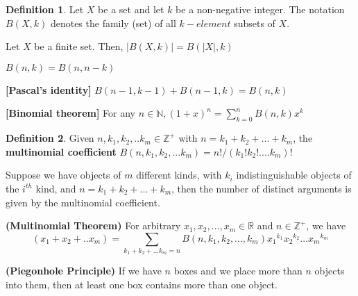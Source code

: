 \documentclass{article}
\theoremstyle{definition}
\newtheorem*{defi}{Definition}
\theoremstyle{definition}
\newenvironment{manualprop}[1]{%
  \renewcommand\themanualpropinner{#1}%
  \manualpropinner
}{\endmanualpropinner}
\theoremstyle{named}
\begin{document}
\begin{defi}
    Let $X$ be a set and let $k$ be a non-negative integer. The notation $B(X, k)$ denotes the family (set) of all $k-element$ subsets of $X$.
\end{defi}

\begin{manualprop}{26}
    Let $X$ be a finite set. Then, $|B(X, k)| = B(|X|, k)$
\end{manualprop}

\begin{manualprop}{27}
    \begin{citemize}
        \item $B(n, k) = B(n, n-k)$
        \item \textbf{[Pascal's identity]} $B(n-1, k-1) + B(n-1, k) = B(n, k)$
        \item \textbf{[Binomial theorem]} For any $n \in \mathbb{N}, (1+x)^n = \sum_{k=0}^{n} B(n, k)x^k$
    \end{citemize}
\end{manualprop}

\begin{defi}
    Given $n, k_1, k_2, .. k_m \in \mathbb{Z^+}$ with $n = k_1+ k_2 + ...+ k_m$, the \textbf{multinomial coefficient} $B(n, k_1, k_2, ... k_m) = n! / (k_1 ! k_2 ! .... k_m) !$ 
\end{defi}

\begin{manualprop} {28}
    \begin{citemize}
        \item Suppose we have objects of $m$ different kinds, with $k_i$ indistinguishable objects of the $i^{th}$ kind, and $n = k_1 + k_2 + ... + k_m$, then the number of distinct arguments is given by the multinomial coefficient.
        \item \textbf{(Multinomial Theorem)} For arbitrary $x_1, x_2, ..., x_m \in \mathbb{R}$ and $n \in \mathbb{Z^+}$, we have $$(x_1 + x_2 + .. x_m) = \sum_{k_1+k_2+...k_m = n} B(n, k_1, k_2, ..., k_m) {x_1}^{k_1} {x_2}^{k_2} ...  {x_m}^{k_m}$$
    \end{citemize}
\end{manualprop}


\begin{manualprop}{29}
    \textbf{(Piegonhole Principle)} If we have $n$
boxes and we place more than $n$ objects into them, then at
least one box contains more than one object.
\end{manualprop}
\end{document}
